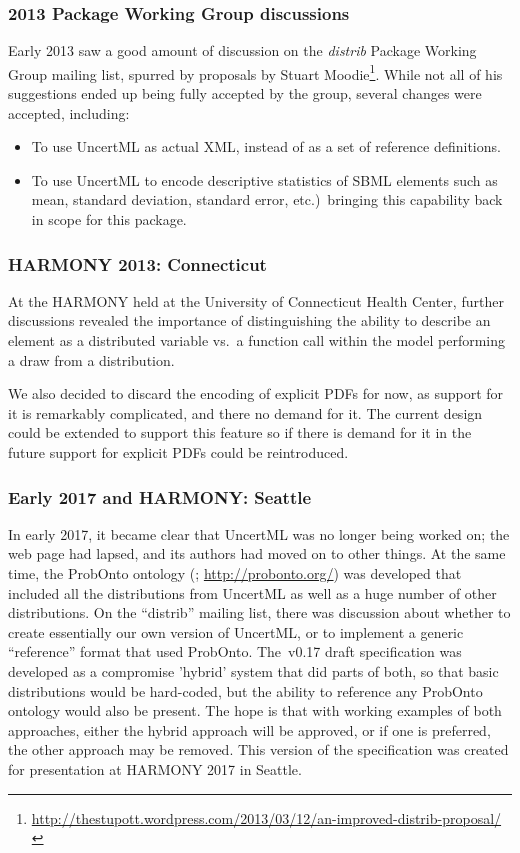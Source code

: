 \documentclass[draftspec]{sbmlpkgspec}
\newcommand{\distribshort}{\emph{distrib}\xspace}
\begin{document}
\subsubsection{2013 Package Working Group discussions}

Early 2013 saw a good amount of discussion on the \distribshort Package Working Group mailing list, spurred by proposals by Stuart Moodie\footnote{\url{http://thestupott.wordpress.com/2013/03/12/an-improved-distrib-proposal/}}.  While not all of his suggestions ended up being fully accepted by the group, several changes were accepted, including:

\begin{itemize}
\item To use UncertML as actual XML, instead of as a set of reference definitions.
\item To use UncertML to encode descriptive statistics of SBML elements such as mean, standard deviation, standard error, etc.)\ bringing this capability back in scope for this package.
\end{itemize}


\subsubsection{HARMONY 2013: Connecticut}

At the HARMONY held at the University of Connecticut Health Center, further discussions revealed the importance of distinguishing the ability to describe an element as a distributed variable vs.\ a function call within the model performing a draw from a distribution.

We also decided to discard the encoding of explicit PDFs for now, as
support for it is remarkably complicated, and there no demand for
it. The current design could be extended to support this feature so if
there is demand for it in the future support for explicit PDFs could
be reintroduced.

\subsubsection{Early 2017 and HARMONY: Seattle}

In early 2017, it became clear that UncertML was no longer being worked on; the web page had lapsed, and its authors had moved on to other things.  At the same time, the ProbOnto ontology (\citealt{swat:2016}; \url{http://probonto.org/}) was developed that included all the distributions from UncertML as well as a huge number of other distributions.  On the ``distrib'' mailing list, there was discussion about whether to create essentially our own version of UncertML, or to implement a generic ``reference'' format that used ProbOnto.  The~v0.17 draft specification was developed as a compromise 'hybrid' system that did parts of both, so that basic distributions would be hard-coded, but the ability to reference any ProbOnto ontology would also be present.  The hope is that with working examples of both approaches, either the hybrid approach will be approved, or if one is preferred, the other approach may be removed.  This version of the specification was created for presentation at HARMONY 2017 in Seattle.
\end{document}
